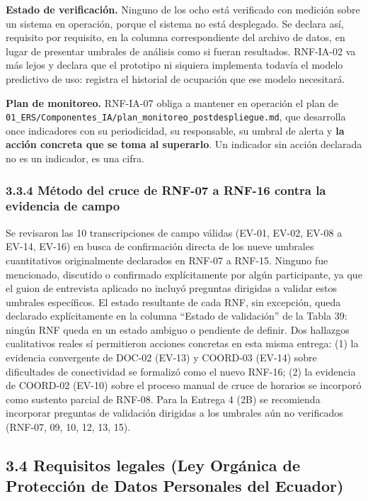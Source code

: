 \noindent\textbf{Estado de verificación.} Ninguno de los ocho está verificado con medición sobre un sistema en operación, porque el sistema no está desplegado. Se declara así, requisito por requisito, en la columna correspondiente del archivo de datos, en lugar de presentar umbrales de análisis como si fueran resultados. RNF-IA-02 va más lejos y declara que el prototipo ni siquiera implementa todavía el modelo predictivo de uso: registra el historial de ocupación que ese modelo necesitará.

\noindent\textbf{Plan de monitoreo.} RNF-IA-07 obliga a mantener en operación el plan de \nolinkurl{01_ERS/Componentes_IA/plan_monitoreo_postdespliegue.md}, que desarrolla once indicadores con su periodicidad, su responsable, su umbral de alerta y \textbf{la acción concreta que se toma al superarlo}. Un indicador sin acción declarada no es un indicador, es una cifra.


\subsubsection*{3.3.4 Método del cruce de RNF-07 a RNF-16 contra la evidencia de campo}


Se revisaron las 10 transcripciones de campo válidas (EV-01, EV-02, EV-08 a EV-14, EV-16) en busca de confirmación directa de los nueve umbrales cuantitativos originalmente declarados en RNF-07 a RNF-15. Ninguno fue mencionado, discutido o confirmado explícitamente por algún participante, ya que el guion de entrevista aplicado no incluyó preguntas dirigidas a validar estos umbrales específicos. El estado resultante de cada RNF, sin excepción, queda declarado explícitamente en la columna ``Estado de validación'' de la Tabla 39: ningún RNF queda en un estado ambiguo o pendiente de definir. Dos hallazgos cualitativos reales sí permitieron acciones concretas en esta misma entrega: (1) la evidencia convergente de DOC-02 (EV-13) y COORD-03 (EV-14) sobre dificultades de conectividad se formalizó como el nuevo RNF-16; (2) la evidencia de COORD-02 (EV-10) sobre el proceso manual de cruce de horarios se incorporó como sustento parcial de RNF-08. Para la Entrega 4 (2B) se recomienda incorporar preguntas de validación dirigidas a los umbrales aún no verificados (RNF-07, 09, 10, 12, 13, 15).

\subsection*{3.4 Requisitos legales (Ley Orgánica de Protección de Datos Personales del Ecuador)}

